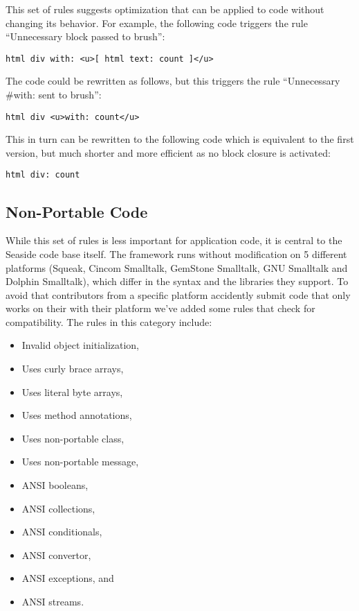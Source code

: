 \documentclass[10pt,twocolumn]{article}
\newcommand{\Seaside}{Seaside\xspace}
\newenvironment{bullets}[0]
	{\begin{itemize}
		\setlength{\itemsep}{1pt}
		\setlength{\parskip}{0pt}
		\setlength{\parsep}{0pt}}
	{\end{itemize}}
\begin{document}
This set of rules suggests optimization that can be applied to code without changing its behavior. For example, the following code triggers the rule ``Unnecessary block passed to brush'':

\begin{lstlisting}
html div with: <u>[ html text: count ]</u>
\end{lstlisting}

The code could be rewritten as follows, but this triggers the rule ``Unnecessary \#with: sent to brush'':

\begin{lstlisting}
html div <u>with: count</u>
\end{lstlisting}

This in turn can be rewritten to the following code which is equivalent to the first version, but much shorter and more efficient as no block closure is activated:

\begin{lstlisting}
html div: count
\end{lstlisting}

\subsection{Non-Portable Code}\label{sec:slime-nonportable}

While this set of rules is less important for application code, it is central to the  \Seaside code base itself. The framework runs without modification on 5 different platforms (Squeak, Cincom Smalltalk, GemStone Smalltalk, GNU Smalltalk and Dolphin Smalltalk), which differ in the syntax and the libraries they support. To avoid that contributors from a specific platform accidently submit code that only works on their with their platform we've added some rules that check for compatibility. The rules in this category include:

\begin{bullets}
	\item Invalid object initialization,
	\item Uses curly brace arrays,
	\item Uses literal byte arrays,
	\item Uses method annotations,
	\item Uses non-portable class,
	\item Uses non-portable message,
	\item ANSI booleans,
	\item ANSI collections,
	\item ANSI conditionals,
	\item ANSI convertor,
	\item ANSI exceptions, and
	\item ANSI streams.
\end{bullets}
\end{document}
